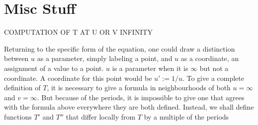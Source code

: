 \section{Misc Stuff}

COMPUTATION OF T AT U OR V INFINITY


Returning to the specific form of the equation, one could draw a distinction between $u$ as a parameter, simply labeling a point, and $u$ as a coordinate, an assignment of a value to a point. $u$ is a parameter when it is $\infty$ but not a coordinate. A coordinate for this point would be $u' := 1/u$. To give a complete definition of $T$, it is necessary to give a formula in neighbourhoods of both $u=\infty$ and $v=\infty$. But because of the periods, it is impossible to give one that agrees with the formula above everywhere they are both defined. Instead, we shall define functions $T'$ and $T''$ that differ locally from $T$ by a multiple of the periods

